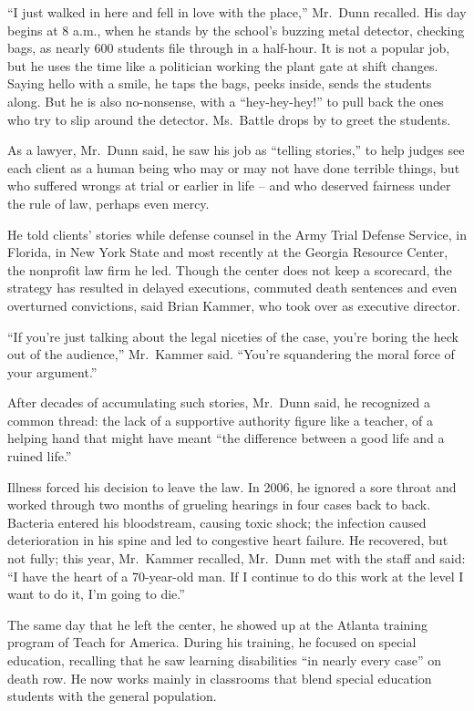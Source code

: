 ﻿\documentclass[12pt]{article}
\begin{document}
``I just walked in here and fell in love with the place,'' Mr.~Dunn recalled. His day begins at 8
a.m., when he stands by the school's buzzing metal detector, checking bags, as nearly 600 students
file through in a half-hour. It is not a popular job, but he uses the time like a politician working
the plant gate at shift changes. Saying hello with a smile, he taps the bags, peeks inside, sends
the students along. But he is also no-nonsense, with a ``hey-hey-hey!'' to pull back the ones who
try to slip around the detector. Ms.~Battle drops by to greet the students.

As a lawyer, Mr.~Dunn said, he saw his job as ``telling stories,'' to help judges see each client as
a human being who may or may not have done terrible things, but who suffered wrongs at trial or
earlier in life -- and who deserved fairness under the rule of law, perhaps even mercy.

He told clients' stories while defense counsel in the Army Trial Defense Service, in Florida, in New
York State and most recently at the Georgia Resource Center, the nonprofit law firm he led. Though
the center does not keep a scorecard, the strategy has resulted in delayed executions, commuted
death sentences and even overturned convictions, said Brian Kammer, who took over as executive
director.

``If you're just talking about the legal niceties of the case, you're boring the heck out of the
audience,'' Mr.~Kammer said. ``You're squandering the moral force of your argument.''

After decades of accumulating such stories, Mr.~Dunn said, he recognized a common thread: the lack
of a supportive authority figure like a teacher, of a helping hand that might have meant ``the
difference between a good life and a ruined life.''

Illness forced his decision to leave the law. In 2006, he ignored a sore throat and worked through
two months of grueling hearings in four cases back to back. Bacteria entered his bloodstream,
causing toxic shock; the infection caused deterioration in his spine and led to congestive heart
failure. He recovered, but not fully; this year, Mr.~Kammer recalled, Mr.~Dunn met with the staff
and said: ``I have the heart of a 70-year-old man. If I continue to do this work at the level I want
to do it, I'm going to die.''

The same day that he left the center, he showed up at the Atlanta training program of Teach for
America. During his training, he focused on special education, recalling that he saw learning
disabilities ``in nearly every case'' on death row. He now works mainly in classrooms that blend
special education students with the general population.
\end{document}
